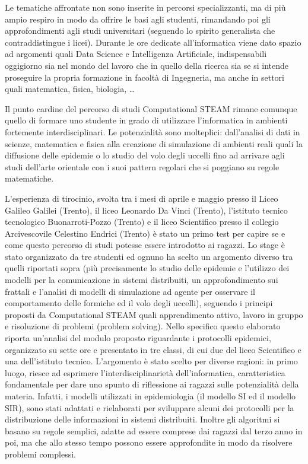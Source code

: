 Le tematiche affrontate non sono inserite in percorsi specializzanti, ma di più ampio respiro in modo da offrire le basi agli studenti, rimandando poi gli approfondimenti agli studi universitari (seguendo lo spirito generalista che contraddistingue i licei). Durante le ore dedicate all'informatica viene dato spazio ad argomenti quali Data Science e Intelligenza Artificiale, indispensabili oggigiorno sia nel mondo del lavoro che in quello della ricerca sia se si intende proseguire la propria formazione in facoltà di Ingegneria, ma anche in settori quali matematica, fisica, biologia, \dots

Il punto cardine del percorso di studi Computational STEAM rimane comunque quello di formare uno studente in grado di utilizzare l'informatica in ambienti fortemente interdisciplinari. Le potenzialità sono molteplici: dall'analisi di dati in scienze, matematica e fisica alla creazione di simulazione di ambienti reali quali la diffusione delle epidemie o lo studio del volo degli uccelli fino ad arrivare agli studi dell'arte orientale con i suoi pattern regolari che si poggiano su regole matematiche.

L'esperienza di tirocinio, svolta tra i mesi di aprile e maggio presso il Liceo Galileo Galilei (Trento), il liceo Leonardo Da Vinci (Trento), l’istituto tecnico tecnologico Buonarroti-Pozzo (Trento) e il liceo Scientifico presso il collegio Arcivescovile Celestino Endrici (Trento) è stato un primo test per capire se e come questo percorso di studi potesse essere introdotto ai ragazzi. 
Lo stage è stato organizzato da tre studenti ed ognuno ha scelto un argomento diverso tra quelli riportati sopra (più precisamente lo studio delle epidemie e l'utilizzo dei modelli per la comunicazione in sistemi distribuiti, un approfondimento sui frattali e l'analisi di modelli di simulazione ad agente per osservare il comportamento delle formiche ed il volo degli uccelli), seguendo i principi proposti da Computational STEAM quali apprendimento attivo, lavoro in gruppo e risoluzione di problemi (problem solving). Nello specifico questo elaborato riporta un'analisi del modulo proposto riguardante i protocolli epidemici, organizzato su sette ore e presentato in tre classi, di cui due del liceo Scientifico e una dell'istituto tecnico. L'argomento è stato scelto per diverse ragioni: in primo luogo, riesce ad esprimere l'interdisciplinarietà dell'informatica, caratteristica fondamentale per dare uno spunto di riflessione ai ragazzi sulle potenzialità della materia. Infatti, i modelli utilizzati in epidemiologia (il modello SI ed il modello SIR), sono stati adattati e rielaborati per sviluppare alcuni dei protocolli per la distribuzione delle informazioni in sistemi distribuiti. Inoltre gli algoritmi si basano su regole semplici, adatte ad essere comprese dai ragazzi dal terzo anno in poi, ma che allo stesso tempo possono essere approfondite in modo da risolvere problemi complessi. 

